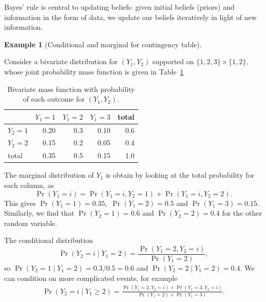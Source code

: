 \documentclass[
  11pt,
  letterpaper,
]{scrbook}
\theoremstyle{definition}
\newtheorem{example}{Example}[chapter]
\theoremstyle{plain}
\theoremstyle{plain}
\theoremstyle{plain}
\theoremstyle{definition}
\theoremstyle{definition}
\theoremstyle{plain}
\theoremstyle{plain}
\theoremstyle{remark}
\begin{document}
Bayes' rule is central to updating beliefs: given initial beliefs
(priors) and information in the form of data, we update our beliefs
iteratively in light of new information.

\begin{example}[Conditional and marginal for contingency
table]\protect\hypertarget{exm-discrete-conditional-marginal}{}\label{exm-discrete-conditional-marginal}

Consider a bivariate distribution for \((Y_1, Y_2)\) supported on
\(\{1, 2, 3\} \times \{1, 2\},\) whose joint probability mass function
is given in Table~\ref{tbl-bivardiscrete}

\begin{longtable}[]{@{}lrrrr@{}}

\caption{\label{tbl-bivardiscrete}Bivariate mass function with
probability of each outcome for \((Y_1, Y_2).\)}

\tabularnewline

\toprule\noalign{}
& \(Y_1=1\) & \(Y_1=2\) & \(Y_1=3\) & total \\
\midrule\noalign{}
\endhead
\bottomrule\noalign{}
\endlastfoot
\(Y_2=1\) & 0.20 & 0.3 & 0.10 & 0.6 \\
\(Y_2=2\) & 0.15 & 0.2 & 0.05 & 0.4 \\
total & 0.35 & 0.5 & 0.15 & 1.0 \\

\end{longtable}

The marginal distribution of \(Y_1\) is obtain by looking at the total
probability for each column, as
\[\Pr(Y_1=i) = \Pr(Y_1=i, Y_2=1)+ \Pr(Y_1=i, Y_2=2).\] This gives
\(\Pr(Y_1=1)=0.35,\) \(\Pr(Y_1=2)=0.5\) and \(\Pr(Y_1=3) = 0.15.\)
Similarly, we find that \(\Pr(Y_2=1)=0.6\) and \(\Pr(Y_2=2)=0.4\) for
the other random variable.

The conditional distribution
\[\Pr(Y_2 = i \mid Y_1=2) = \frac{\Pr(Y_1=2, Y_2=i)}{\Pr(Y_1=2)},\] so
\(\Pr(Y_2 = 1 \mid Y_1=2) = 0.3/0.5 = 0.6\) and
\(\Pr(Y_2=2 \mid Y_1=2) = 0.4.\) We can condition on more complicated
events, for example \begin{align*}
\Pr(Y_2 = i \mid Y_1 \ge 2) = \frac{\Pr(Y_1=2, Y_2=i) + \Pr(Y_1=3, Y_2=i)}{\Pr(Y_1=2) + \Pr(Y_1=3)}.
\end{align*}

\end{example}
\end{document}

